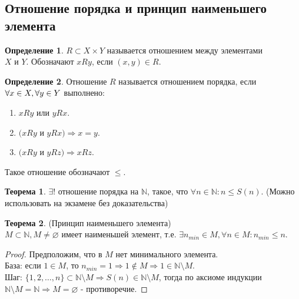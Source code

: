 \documentclass[a4paper, 12pt]{article}
\newcommand{\N}{\mathbb{N}}
\renewcommand{\emptyset}{\varnothing}
\theoremstyle{definition}
\newtheorem*{definition}{Определение}
\newtheorem*{theorem}{Теорема}
\begin{document}
    \subsection{Отношение порядка и принцип наименьшего элемента}
        \begin{definition}
            $R\subset X\times Y$ называется отношением между элементами\\ $X$ и $Y$. Обозначают $xRy$, если $(x,y)\in R$.
        \end{definition}
        \begin{definition}
            Отношение $R$ называется отношением порядка, если $\forall x\in X,\\ \forall y\in Y$ выполнено:
            \begin{enumerate}
                \item $xRy$ или $yRx$. 
                \item $(xRy$ и $yRx) \Rightarrow x=y$. 
                \item $(xRy$ и $yRz) \Rightarrow xRz$.
            \end{enumerate}
            Такое отношение обозначают $\leq$.
        \end{definition}
        \begin{theorem}
            $\exists !$ отношение порядка на $\N$, такое, что $\forall n\in \N: n\leq S(n)$. (Можно использовать на экзамене без доказательства)
        \end{theorem}
        \begin{theorem} (Принцип наименьшего элемента)\\
            $M\subset \N, M\ne \emptyset$ имеет наименьшей элемент, т.е. $\exists n_{min}\in M, \forall n\in M: n_{min}\leq n$.
        \end{theorem} 
        \begin{proof}
            Предположим, что в $M$ нет минимального элемента.\\
            База: если $1\in M$, то $n_{min}=1 \Rightarrow 1\notin M \Rightarrow 1\in \N\setminus M$.\\
            Шаг: $\{1,2,\dots, n\}\subset \N\setminus M \Rightarrow S(n)\in \N\setminus M$, тогда по аксиоме индукции $\N\setminus M=\N\Rightarrow M = \emptyset$ - противоречие.
        \end{proof}
\end{document}

